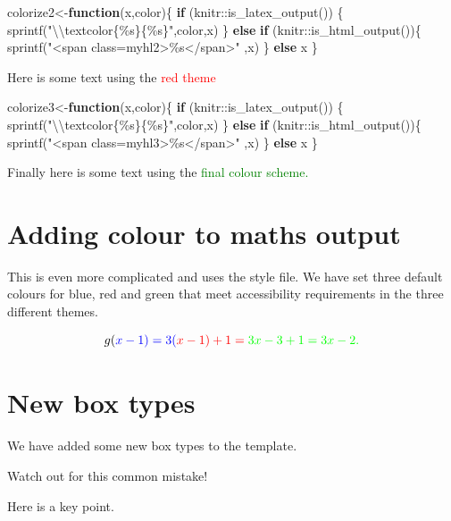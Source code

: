 \documentclass[
  letterpaper,
  oneside]{book}
\newenvironment{Shaded}{\begin{snugshade}}{\end{snugshade}}
\newcommand{\ControlFlowTok}[1]{\textcolor[rgb]{0.00,0.23,0.31}{\textbf{#1}}}
\newcommand{\FunctionTok}[1]{\textcolor[rgb]{0.28,0.35,0.67}{#1}}
\newcommand{\NormalTok}[1]{\textcolor[rgb]{0.00,0.23,0.31}{#1}}
\newcommand{\OtherTok}[1]{\textcolor[rgb]{0.00,0.23,0.31}{#1}}
\newcommand{\SpecialCharTok}[1]{\textcolor[rgb]{0.37,0.37,0.37}{#1}}
\newcommand{\StringTok}[1]{\textcolor[rgb]{0.13,0.47,0.30}{#1}}
\numberwithin{equation}{section}
\numberwithin{figure}{section}
\theoremstyle{break}
\theoremstyle{plain}
\theoremstyle{remark}
\begin{document}
\begin{Shaded}
\begin{Highlighting}[]
\NormalTok{colorize2}\OtherTok{\textless{}{-}}\ControlFlowTok{function}\NormalTok{(x,color)\{}
  \ControlFlowTok{if}\NormalTok{ (knitr}\SpecialCharTok{::}\FunctionTok{is\_latex\_output}\NormalTok{()) \{}
    \FunctionTok{sprintf}\NormalTok{(}\StringTok{"}\SpecialCharTok{\textbackslash{}\textbackslash{}}\StringTok{textcolor\{\%s\}\{\%s\}"}\NormalTok{,color,x)}
\NormalTok{  \} }\ControlFlowTok{else} \ControlFlowTok{if}\NormalTok{ (knitr}\SpecialCharTok{::}\FunctionTok{is\_html\_output}\NormalTok{())\{}
    \FunctionTok{sprintf}\NormalTok{(}\StringTok{"\textless{}span class=\textquotesingle{}myhl2\textquotesingle{}\textgreater{}\%s\textless{}/span\textgreater{}"}\NormalTok{ ,x)}
\NormalTok{  \} }\ControlFlowTok{else}\NormalTok{ x}
\NormalTok{\}}
\end{Highlighting}
\end{Shaded}

Here is some text using the \textcolor{red}{red theme}

\begin{Shaded}
\begin{Highlighting}[]
\NormalTok{colorize3}\OtherTok{\textless{}{-}}\ControlFlowTok{function}\NormalTok{(x,color)\{}
  \ControlFlowTok{if}\NormalTok{ (knitr}\SpecialCharTok{::}\FunctionTok{is\_latex\_output}\NormalTok{()) \{}
    \FunctionTok{sprintf}\NormalTok{(}\StringTok{"}\SpecialCharTok{\textbackslash{}\textbackslash{}}\StringTok{textcolor\{\%s\}\{\%s\}"}\NormalTok{,color,x)}
\NormalTok{  \} }\ControlFlowTok{else} \ControlFlowTok{if}\NormalTok{ (knitr}\SpecialCharTok{::}\FunctionTok{is\_html\_output}\NormalTok{())\{}
    \FunctionTok{sprintf}\NormalTok{(}\StringTok{"\textless{}span class=\textquotesingle{}myhl3\textquotesingle{}\textgreater{}\%s\textless{}/span\textgreater{}"}\NormalTok{ ,x)}
\NormalTok{  \} }\ControlFlowTok{else}\NormalTok{ x}
\NormalTok{\}}
\end{Highlighting}
\end{Shaded}

Finally here is some text using the
\textcolor{green}{final colour scheme.}

\section{Adding colour to maths
output}\label{adding-colour-to-maths-output}

This is even more complicated and uses the style file. We have set three
default colours for blue, red and green that meet accessibility
requirements in the three different themes.

\[
g(\color{blue}{x-1}) = 3(\color{red}{x-1}) + 1 = \color{green}{3x} - 3 + 1 = 3x-2.
\]

\section{New box types}\label{new-box-types}

We have added some new box types to the template.

Watch out for this common mistake!

Here is a key point.


\backmatter
\end{document}
